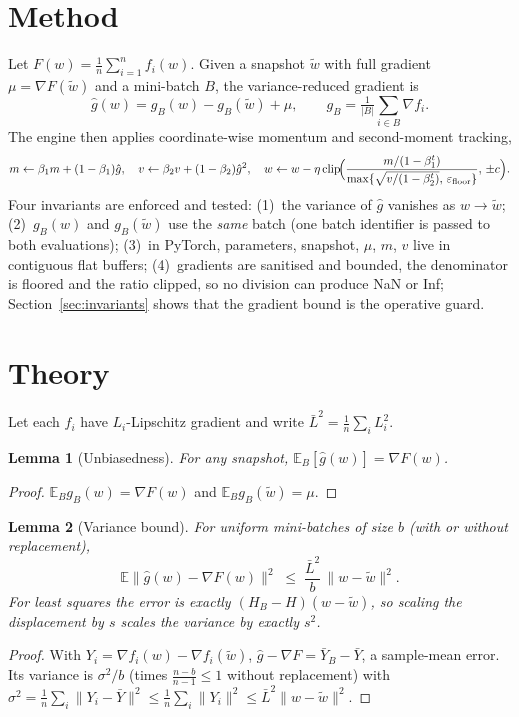 \documentclass[11pt]{article}
\newtheorem{lemma}{Lemma}
\theoremstyle{remark}
\newcommand{\E}{\mathbb{E}}
\newcommand{\norm}[1]{\lVert #1\rVert}
\newcommand{\ghat}{\hat g}
\begin{document}
\section{Method}\label{sec:method}
Let $F(w)=\frac1n\sum_{i=1}^n f_i(w)$. Given a snapshot $\tilde w$ with full gradient $\mu=\nabla F(\tilde w)$ and a mini-batch $B$, the variance-reduced gradient is
\[
\ghat(w)=g_B(w)-g_B(\tilde w)+\mu ,\qquad g_B=\tfrac1{|B|}\textstyle\sum_{i\in B}\nabla f_i .
\]
The engine then applies coordinate-wise momentum and second-moment tracking,
\[
m\leftarrow\beta_1 m+(1-\beta_1)\ghat,\quad v\leftarrow\beta_2 v+(1-\beta_2)\ghat^{2},\quad
w\leftarrow w-\eta\,\mathrm{clip}\!\Big(\frac{m/(1-\beta_1^t)}{\max\{\sqrt{v/(1-\beta_2^t)},\,\varepsilon_{\rm floor}\}},\,\pm c\Big).
\]
Four invariants are enforced and tested: (1)~the variance of $\ghat$ vanishes as $w\to\tilde w$; (2)~$g_B(w)$ and $g_B(\tilde w)$ use the \emph{same} batch (one batch identifier is passed to both evaluations); (3)~in PyTorch, parameters, snapshot, $\mu$, $m$, $v$ live in contiguous flat buffers; (4)~gradients are sanitised and bounded, the denominator is floored and the ratio clipped, so no division can produce NaN or Inf; Section~\ref{sec:invariants} shows that the gradient bound is the operative guard.

\section{Theory}\label{sec:theory}
Let each $f_i$ have $L_i$-Lipschitz gradient and write $\bar L^2=\frac1n\sum_iL_i^2$.

\begin{lemma}[Unbiasedness]\label{lem:unb}
For any snapshot, $\E_B[\ghat(w)]=\nabla F(w)$.
\end{lemma}
\begin{proof}
$\E_B g_B(w)=\nabla F(w)$ and $\E_B g_B(\tilde w)=\mu$.
\end{proof}

\begin{lemma}[Variance bound]\label{lem:var}
For uniform mini-batches of size $b$ (with or without replacement),
\[
\E\norm{\ghat(w)-\nabla F(w)}^2\;\le\;\frac{\bar L^2}{b}\,\norm{w-\tilde w}^2 .
\]
For least squares the error is exactly $(H_B-H)(w-\tilde w)$, so scaling the displacement by $s$ scales the variance by exactly $s^2$.
\end{lemma}
\begin{proof}
With $Y_i=\nabla f_i(w)-\nabla f_i(\tilde w)$, $\ghat-\nabla F=\bar Y_B-\bar Y$, a sample-mean error. Its variance is $\sigma^2/b$ (times $\frac{n-b}{n-1}\le1$ without replacement) with $\sigma^2=\frac1n\sum_i\norm{Y_i-\bar Y}^2\le\frac1n\sum_i\norm{Y_i}^2\le \bar L^2\norm{w-\tilde w}^2$.
\end{proof}
\end{document}
